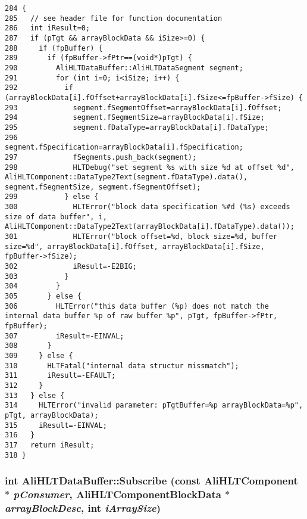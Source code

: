 \footnotesize\begin{verbatim}284 {
285   // see header file for function documentation
286   int iResult=0;
287   if (pTgt && arrayBlockData && iSize>=0) {
288     if (fpBuffer) {
289       if (fpBuffer->fPtr==(void*)pTgt) {
290         AliHLTDataBuffer::AliHLTDataSegment segment;
291         for (int i=0; i<iSize; i++) {
292           if (arrayBlockData[i].fOffset+arrayBlockData[i].fSize<=fpBuffer->fSize) {
293             segment.fSegmentOffset=arrayBlockData[i].fOffset;
294             segment.fSegmentSize=arrayBlockData[i].fSize;
295             segment.fDataType=arrayBlockData[i].fDataType;
296             segment.fSpecification=arrayBlockData[i].fSpecification;
297             fSegments.push_back(segment);
298             HLTDebug("set segment %s with size %d at offset %d", AliHLTComponent::DataType2Text(segment.fDataType).data(), segment.fSegmentSize, segment.fSegmentOffset);
299           } else {
300             HLTError("block data specification %#d (%s) exceeds size of data buffer", i, AliHLTComponent::DataType2Text(arrayBlockData[i].fDataType).data());
301             HLTError("block offset=%d, block size=%d, buffer size=%d", arrayBlockData[i].fOffset, arrayBlockData[i].fSize, fpBuffer->fSize);
302             iResult=-E2BIG;
303           }
304         }
305       } else {
306         HLTError("this data buffer (%p) does not match the internal data buffer %p of raw buffer %p", pTgt, fpBuffer->fPtr, fpBuffer);
307         iResult=-EINVAL;
308       }
309     } else {
310       HLTFatal("internal data structur missmatch");
311       iResult=-EFAULT;
312     }
313   } else {
314     HLTError("invalid parameter: pTgtBuffer=%p arrayBlockData=%p", pTgt, arrayBlockData);
315     iResult=-EINVAL;
316   }
317   return iResult;
318 }
\end{verbatim}\normalsize 


\subsubsection{\setlength{\rightskip}{0pt plus 5cm}int Ali\-HLTData\-Buffer::Subscribe (const {\bf Ali\-HLTComponent} $\ast$ {\em p\-Consumer}, {\bf Ali\-HLTComponent\-Block\-Data} $\ast$ {\em array\-Block\-Desc}, int {\em i\-Array\-Size})}\label{classAliHLTDataBuffer_a6}


